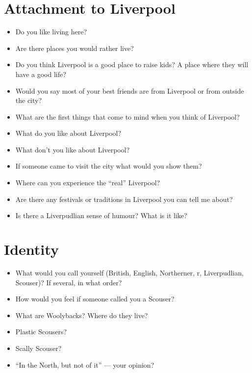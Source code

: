	\section*{Attachment to Liverpool}
	\begin{multicols}{2}
		\begin{itemize}
			\item Do you like living here?
			\item Are there places you would rather live?
			\item Do you think Liverpool is a good place to raise kids? A place where they will have a good life?
			\item Would you say most of your best friends are from Liverpool or from outside the city?
			\item What are the first things that come to mind when you think of Liverpool?
			\item What do you like about Liverpool?
			\item What don't you like about Liverpool?
			\item If someone came to visit the city what would you show them?
			\item Where can you experience the \enquote{real} Liverpool?
			\item Are there any festivals or traditions in Liverpool you can tell me about?
			\item Is there a Liverpudlian sense of humour? What is it like?
		\end{itemize}
	\end{multicols}
	
	\section*{Identity}
	\begin{multicols}{2}
		\begin{itemize}
			\item What would you call yourself (British, English, Northerner, r, Liverpudlian, Scouser)? If several, in what order?
			\item How would you feel if someone called you a Scouser?
			\item What are Woolybacks? Where do they live?
			\item Plastic Scousers?
			\item Scally Scouser?
			\item ``In the North, but not of it'' --- your opinion?
		\end{itemize}
	\end{multicols}
	

